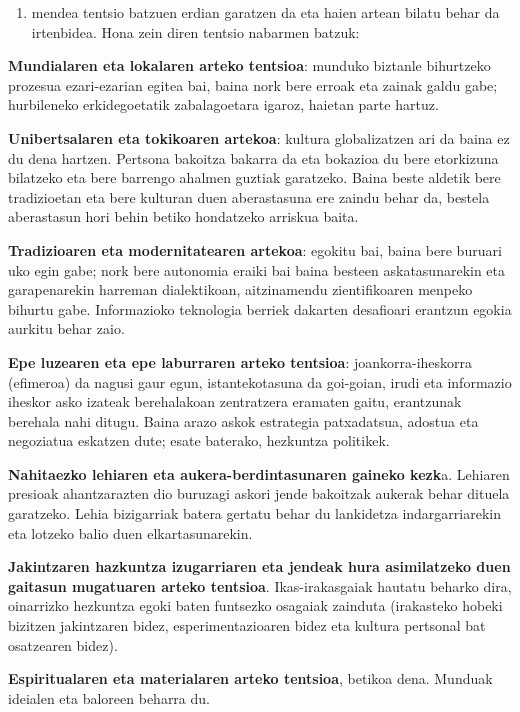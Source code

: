 \documentclass[
]{book}
\providecommand{\tightlist}{%
  \setlength{\itemsep}{0pt}\setlength{\parskip}{0pt}}
\begin{document}
\begin{enumerate}
\def\labelenumi{\Roman{enumi}.}
\setcounter{enumi}{20}
\tightlist
\item
  mendea tentsio batzuen erdian garatzen da eta haien artean bilatu behar da irtenbidea. Hona zein diren tentsio nabarmen batzuk:
\end{enumerate}

\textbf{Mundialaren eta lokalaren arteko tentsioa}: munduko biztanle bihurtzeko prozesua ezari-ezarian egitea bai, baina nork bere erroak eta zainak galdu gabe; hurbileneko erkidegoetatik zabalagoetara igaroz, haietan parte hartuz.

\textbf{Unibertsalaren eta tokikoaren artekoa}: kultura globalizatzen ari da baina ez du dena hartzen. Pertsona bakoitza bakarra da eta bokazioa du bere etorkizuna bilatzeko eta bere barrengo ahalmen guztiak garatzeko. Baina beste aldetik bere tradizioetan eta bere kulturan duen aberastasuna ere zaindu behar da, bestela aberastasun hori behin betiko hondatzeko arriskua baita.

\textbf{Tradizioaren eta modernitatearen artekoa}: egokitu bai, baina bere buruari uko egin gabe; nork bere autonomia eraiki bai baina besteen askatasunarekin eta garapenarekin harreman dialektikoan, aitzinamendu zientifikoaren menpeko bihurtu gabe. Informazioko teknologia berriek dakarten desafioari erantzun egokia aurkitu behar zaio.

\textbf{Epe luzearen eta epe laburraren arteko tentsioa}: joankorra-iheskorra (efimeroa) da nagusi gaur egun, istantekotasuna da goi-goian, irudi eta informazio iheskor asko izateak berehalakoan zentratzera eramaten gaitu, erantzunak berehala nahi ditugu. Baina arazo askok estrategia patxadatsua, adostua eta negoziatua eskatzen dute; esate baterako, hezkuntza politikek.

\textbf{Nahitaezko lehiaren eta aukera-berdintasunaren gaineko kezk}a. Lehiaren presioak ahantzarazten dio buruzagi askori jende bakoitzak aukerak behar dituela garatzeko. Lehia bizigarriak batera gertatu behar du lankidetza indargarriarekin eta lotzeko balio duen elkartasunarekin.

\textbf{Jakintzaren hazkuntza izugarriaren eta jendeak hura asimilatzeko duen gaitasun mugatuaren arteko tentsioa}. Ikas-irakasgaiak hautatu beharko dira, oinarrizko hezkuntza egoki baten funtsezko osagaiak zainduta (irakasteko hobeki bizitzen jakintzaren bidez, esperimentazioaren bidez eta kultura pertsonal bat osatzearen bidez).

\textbf{Espiritualaren eta materialaren arteko tentsioa}, betikoa dena. Munduak ideialen eta baloreen beharra du.
\end{document}
